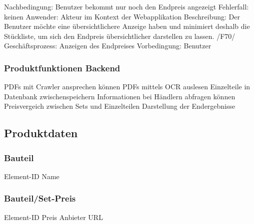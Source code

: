 Nachbedingung: Benutzer bekommt nur noch den Endpreis angezeigt\newline
Fehlerfall: keinen\newline
Anwender: Akteur im Kontext der Webapplikation \newline
Beschreibung: Der Benutzer möchte eine übersichtlichere Anzeige haben und minimiert deshalb die Stückliste, um sich den Endpreis übersichtlicher darstellen zu lassen.\newline\newline
/F70/\newline
Geschäftsprozess: Anzeigen des Endpreises \newline
Vorbedingung: Benutzer \newline

\subsubsection{Produktfunktionen Backend} 
PDFs mit Crawler ansprechen können \newline
PDFs mittels OCR auslesen \newline
Einzelteile in Datenbank zwischenspeichern \newline
Informationen bei Händlern abfragen können \newline
Preisvergeich zwischen Sets und Einzelteilen \newline
Darstellung der Endergebnisse \newline

\subsection{Produktdaten}

\subsubsection{Bauteil}
Element-ID\newline
Name \newline

\subsubsection{Bauteil/Set-Preis}
Element-ID\newline
Preis\newline
Anbieter\newline
URL\newline

